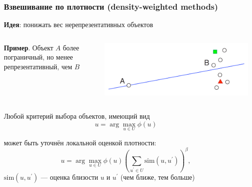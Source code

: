 \documentclass[fullscreen=true, bookmarks=true, hyperref={pdfencoding=unicode}]{beamer}
\begin{document}
\begin{frame}
  \frametitle{Взвешивание по плотности (density-weighted methods)}

  {\bf Идея}: понижать вес нерепрезентативных  объектов

  \begin{columns}
    \begin{column}{.4\paperwidth}
      {\bf Пример}. Объект $A$ более пограничный, но менее  репрезентативный, чем $B$
    \end{column}
    \begin{column}{.4\paperwidth}
      \begin{center}
        \includegraphics[keepaspectratio,
                         width=.4\paperwidth]{density_weighted.png}
      \end{center}
    \end{column}
  \end{columns}


  Любой критерий выбора объектов, имеющий вид
  $$ u = \arg\max\limits_{u \in U} \phi(u) $$

  может быть уточнён локальной оценкой плотности:
  $$ u = \arg\max\limits_{u \in U} \phi(u) \left(
  \sum\limits_{u^\prime \in U} \text{sim}(u,u^\prime) \right)^\beta,$$
  $\text{sim}(u,u^\prime)$ — оценка близости $u$ и $u^\prime$ (чем ближе, тем больше)

\end{frame}
\end{document}
